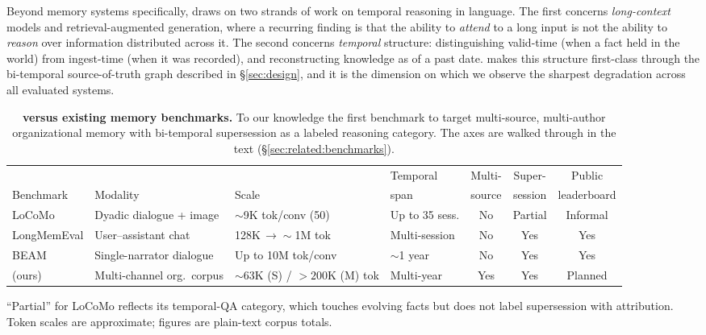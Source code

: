 Beyond memory systems specifically, \bench{} draws on two strands of work on
temporal reasoning in language. The first concerns \emph{long-context} models and
retrieval-augmented generation, where a recurring finding is that the ability to
\emph{attend} to a long input is not the ability to \emph{reason} over information
distributed across it. The second concerns \emph{temporal} structure:
distinguishing valid-time (when a fact held in the world) from ingest-time (when it
was recorded), and reconstructing knowledge as of a past date. \bench{} makes this
structure first-class through the bi-temporal source-of-truth graph described in
\S\ref{sec:design}, and it is the dimension on which we observe the sharpest
degradation across all evaluated systems.

\begin{table}[t]
  \centering
  \caption{\textbf{\bench{} versus existing memory benchmarks.} To our knowledge
    the first benchmark to target multi-source, multi-author organizational memory
    with bi-temporal supersession as a labeled reasoning category. The axes are
    walked through in the text (\S\ref{sec:related:benchmarks}).}
  \label{tab:bench-comparison}
  \small
  \setlength{\tabcolsep}{4pt}
  \begin{tabular}{@{}l p{2.5cm} p{2.5cm} l c c c@{}}
    \toprule
    & & & Temporal & Multi- & Super- & Public \\
    Benchmark & Modality & Scale & span & source & session & leaderboard \\
    \midrule
    LoCoMo
      & Dyadic dialogue + image
      & $\sim$9K tok/conv (50)
      & Up to 35 sess.
      & No
      & Partial
      & Informal \\
    LongMemEval
      & User--assistant chat
      & 128K\,$\rightarrow\sim$1M tok
      & Multi-session
      & No
      & Yes
      & Yes \\
    BEAM
      & Single-narrator dialogue
      & Up to 10M tok/conv
      & $\sim$1 year
      & No
      & Yes
      & Yes \\
    \midrule
    \bench{} (ours)
      & Multi-channel org.\ corpus
      & $\sim$63K (S) / ${>}200$K (M) tok
      & Multi-year
      & Yes
      & Yes
      & Planned \\
    \bottomrule
  \end{tabular}
  \par\smallskip
  {\footnotesize ``Partial'' for LoCoMo reflects its temporal-QA category, which
  touches evolving facts but does not label supersession with attribution. Token
  scales are approximate; \bench{} figures are plain-text corpus totals.}
\end{table}
